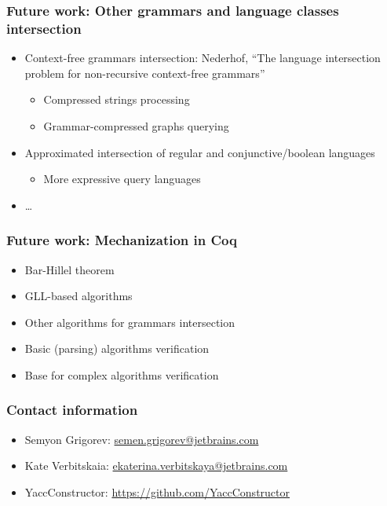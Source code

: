 \documentclass[xcolor=table]{beamer}
\begin{document}
\begin{frame}[fragile]
\transwipe[direction=90]
\frametitle{Future work: Other grammars and language classes intersection}
  \begin{itemize}
     \item Context-free grammars intersection: Nederhof, ``The language intersection problem for non-recursive context-free grammars''
     \begin{itemize}  
       \item Compressed strings processing
       \item Grammar-compressed graphs querying
     \end{itemize}
     \item Approximated intersection of regular and conjunctive/boolean languages
     \begin{itemize}  
       \item More expressive query languages
     \end{itemize}
     \item \dots
  \end{itemize}
\end{frame}

\begin{frame}[fragile]
\transwipe[direction=90]
\frametitle{Future work: Mechanization in Coq}
\begin{itemize}
     \item Bar-Hillel theorem
     \item GLL-based algorithms
     \item Other algorithms for grammars intersection
\end{itemize}
\begin{itemize}
     \item Basic (parsing) algorithms verification
     \item Base for complex algorithms verification
\end{itemize}


\end{frame}

            
\begin{frame}
\transwipe[direction=90]
\frametitle{Contact information}
\begin{itemize}
  \item Semyon Grigorev: \href{mailto:semen.grigorev@jetbrains.com}{semen.grigorev@jetbrains.com}
  \item Kate Verbitskaia: \href{mailto:ekaterina.verbitskaya@jetbrains.com}{ekaterina.verbitskaya@jetbrains.com}
\end{itemize}
\begin{itemize}
  \item YaccConstructor: \href{https://github.com/YaccConstructor}{https://github.com/YaccConstructor}
\end{itemize}
\end{frame}
\end{document}
